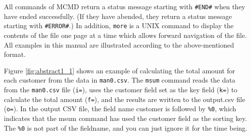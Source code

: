 

All commands of MCMD return a status message starting with \verb|#END#| when they have ended successfully. (If they have abended, they return a status message starting with \verb|#ERROR#|.) In addition, \verb|more| is a UNIX command to display the contents of the file one page at a time which allows forward navigation of the file. All examples in this manual are illustrated according to the above-mentioned format.


Figure \ref{fig:abstract1_1} shows an example of calculating the total amount for each customer from the data in \verb|man0.csv|. The \verb|msum| command reads the data from the \verb|man0.csv| file (\verb|i=|), uses the customer field set as the key field (\verb|k=|) to calculate the total amount (\verb|f=|), and the results are written to the output.csv file (\verb|o=|). In the output CSV file, the field name customer is followed by \verb|%0|, which indicates that the msum command has used the customer field as the sorting key. The \verb|%0| is not part of the fieldname, and you can just ignore it for the time being.



